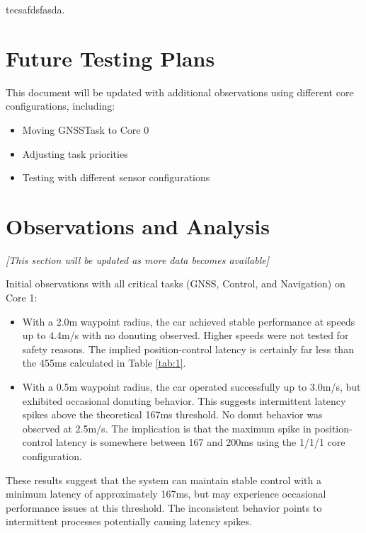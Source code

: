 \documentclass{article}
\begin{document}
	
	tecsafdsfasda.
	
	\section{Future Testing Plans}
	
	This document will be updated with additional observations using different core configurations, including:
	\begin{itemize}
		\item Moving GNSSTask to Core 0
		\item Adjusting task priorities
		\item Testing with different sensor configurations
	\end{itemize}
	
	\section{Observations and Analysis}
	
	\textit{[This section will be updated as more data becomes available]}
	
	Initial observations with all critical tasks (GNSS, Control, and Navigation) on Core 1:
	
	\begin{itemize}
		\item With a 2.0m waypoint radius, the car achieved stable performance at speeds up to 4.4m/s with no donuting observed. Higher speeds were not tested for safety reasons. The implied position-control latency is certainly far less than the 455ms calculated in Table \ref{tab:1}.
		
		\item With a 0.5m waypoint radius, the car operated successfully up to 3.0m/s, but exhibited occasional donuting behavior. This suggests intermittent latency spikes above the theoretical 167ms threshold. No donut behavior was observed at 2.5m/s. The implication is that the maximum spike in position-control latency is somewhere between 167 and 200ms using the 1/1/1 core configuration. 
	\end{itemize}
	
	These results suggest that the system can maintain stable control with a minimum latency of approximately 167ms, but may experience occasional performance issues at this threshold. The inconsistent behavior points to intermittent processes potentially causing latency spikes.
	
\end{document}
